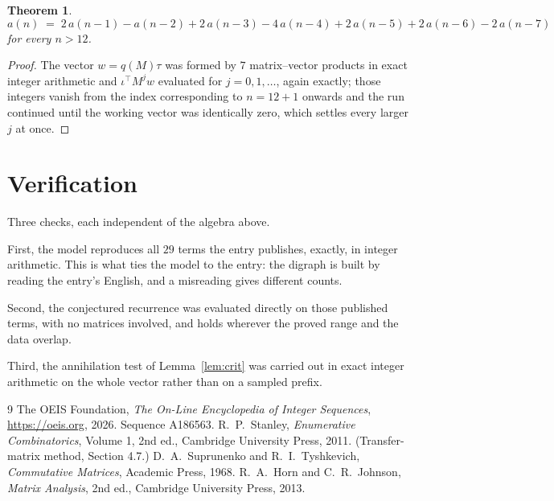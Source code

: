 \documentclass[11pt,a4paper]{article}
\theoremstyle{plain}
\newtheorem{theorem}{Theorem}
\theoremstyle{definition}
\begin{document}
\begin{theorem}
\[
a(n)\;=\;2\,a(n-1) - a(n-2) + 2\,a(n-3) - 4\,a(n-4) + 2\,a(n-5) + 2\,a(n-6) - 2\,a(n-7)
\]
for every $n>12$.
\end{theorem}

\begin{proof}
The vector $w=q(M)\tau$ was formed by $7$ matrix--vector products in exact integer
arithmetic and $\iota^{\!\top}M^{j}w$ evaluated for $j=0,1,\dots$, again exactly; those
integers vanish from the index corresponding to $n=12+1$ onwards and the run continued
until the working vector was identically zero, which settles every larger $j$ at once.
\end{proof}

\section{Verification}

Three checks, each independent of the algebra above.

First, the model reproduces all $29$ terms the entry publishes, exactly, in integer
arithmetic. This is what ties the model to the entry: the digraph is built by reading the
entry's English, and a misreading gives different counts.

Second, the conjectured recurrence was evaluated directly on those published terms, with no
matrices involved, and holds wherever the proved range and the data overlap.

Third, the annihilation test of Lemma~\ref{lem:crit} was carried out in exact integer
arithmetic on the whole vector rather than on a sampled prefix.

\begin{thebibliography}{9}
 The OEIS Foundation, \emph{The On-Line Encyclopedia of Integer
Sequences}, \url{https://oeis.org}, 2026. Sequence A186563.
 R.~P.~Stanley, \emph{Enumerative Combinatorics}, Volume 1, 2nd ed.,
Cambridge University Press, 2011. (Transfer-matrix method, Section 4.7.)
 D.~A.~Suprunenko and R.~I.~Tyshkevich, \emph{Commutative Matrices},
Academic Press, 1968.
 R.~A.~Horn and C.~R.~Johnson, \emph{Matrix Analysis}, 2nd ed., Cambridge
University Press, 2013.
\end{thebibliography}
\end{document}

